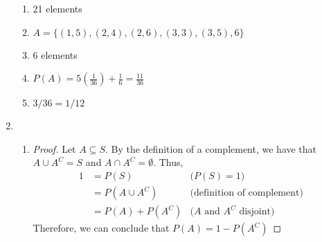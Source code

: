 \documentclass[12pt,reqno]{article}
\theoremstyle{plain}
\theoremstyle{definition}
\begin{document}
\begin{enumerate}
\begin{enumerate}
        \item 21 elements
        \item \(A = \{(1,5),(2,4),(2,6),(3,3),(3,5),6\}\)
        \item 6 elements
        \item \(P(A) = 5(\frac{1}{36}) + \frac{1}{6} = \frac{11}{36}\)
        \item \(3/36 = 1/12\) \bigskip
    \end{enumerate}
    \item \begin{enumerate}
        \item \begin{proof}
            Let \(A\subseteq S\). By the definition of a complement, we have that \(A\cup A^C=S\)
            and \(A\cap A^C=\emptyset\). Thus, 
            \begin{align*}
               1 &= P(S) & \text{(\(P(S)=1\))}\\
               &= P(A\cup A^C) & \text{(definition of complement)}\\
               &=P(A)+P(A^C) & \text{(\(A\) and \(A^C\) disjoint)}
            \end{align*}
            Therefore, we can conclude that \(P(A)=1-P(A^C)\)
        \end{proof}
    \end{enumerate}
\end{enumerate}





\end{document}
